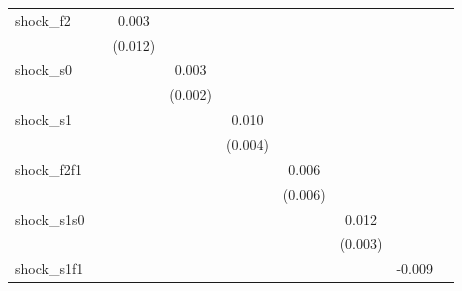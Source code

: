 {\begin{tabular}{l*{8}{c}}
\addlinespace
shock\_f2    &                     &       0.003         &                     &                     &                     &                     &                     &                     \\
            &                     &     (0.012)         &                     &                     &                     &                     &                     &                     \\
\addlinespace
shock\_s0    &                     &                     &       0.003         &                     &                     &                     &                     &                     \\
            &                     &                     &     (0.002)         &                     &                     &                     &                     &                     \\
\addlinespace
shock\_s1    &                     &                     &                     &       0.010\sym{**} &                     &                     &                     &                     \\
            &                     &                     &                     &     (0.004)         &                     &                     &                     &                     \\
\addlinespace
shock\_f2f1  &                     &                     &                     &                     &       0.006         &                     &                     &                     \\
            &                     &                     &                     &                     &     (0.006)         &                     &                     &                     \\
\addlinespace
shock\_s1s0  &                     &                     &                     &                     &                     &       0.012\sym{***}&                     &                     \\
            &                     &                     &                     &                     &                     &     (0.003)         &                     &                     \\
\addlinespace
shock\_s1f1  &                     &                     &                     &                     &                     &                     &      -0.009         &                     \\

\end{tabular}}
